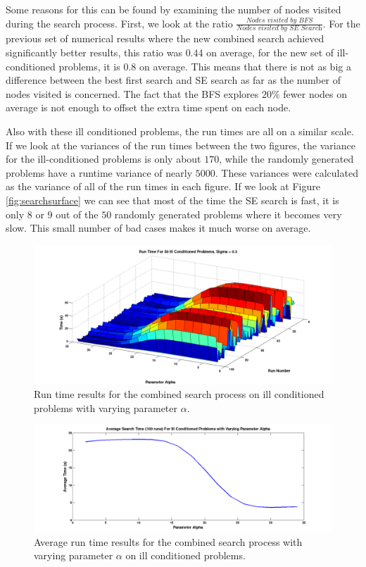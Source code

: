 \documentclass[12pt,Bold,letterpaper]{mcgilletdclass}
\begin{document}
Some reasons for this can be found by examining the number of nodes visited during the search process. First, we look at the ratio $\frac{\textit{Nodes visited by BFS}}{\textit{Nodes visited by SE Search}}$. For the previous set of numerical results where the new combined search achieved significantly better results, this ratio was $0.44$ on average, for the new set of ill-conditioned problems, it is $0.8$ on average. This means that there is not as big a difference between the best first search and SE search as far as the number of nodes visited is concerned. The fact that the BFS explores $20\%$ fewer nodes on average is not enough to offset the extra time spent on each node.

Also with these ill conditioned problems, the run times are all on a similar scale. If we look at the variances of the run times between the two figures, the variance for the ill-conditioned problems is only about $170$, while the randomly generated problems have a runtime variance of nearly $5000$. These variances were calculated as the variance of all of the run times in each figure. If we look at Figure \ref{fig:searchsurface} we can see that most of the time the SE search is fast, it is only $8$ or $9$ out of the $50$ randomly generated problems where it becomes very slow. This small number of bad cases makes it much worse on average.
 
\begin{figure}
\centering
\includegraphics[scale=0.36]{illConditionedSearch.png}
\caption{Run time results for the combined search process on ill conditioned problems with varying parameter $\alpha$.}
\label{fig:illConditionedSearch}
\end{figure}

\begin{figure}
\centering
\includegraphics[scale=0.36]{averageSearchTimesIll.png}
\caption{Average run time results for the combined search process with varying parameter $\alpha$ on ill conditioned problems.}
\label{fig:searchAverageIll}
\end{figure}
\end{document}
